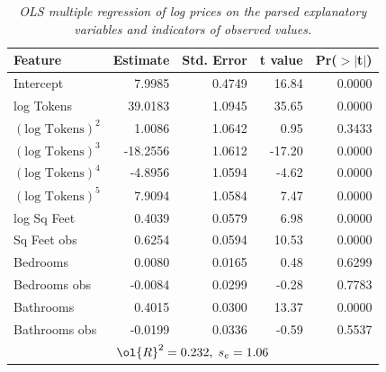 \documentclass[10pt]{article}
\begin{document}
 
 \begin{table}[ht]
\caption{ \label{tab:parsed} {\sl OLS multiple regression of log prices on the
 parsed explanatory variables and  indicators of observed values.}}
\centering
\begin{tabular}{lrrrr}
  \hline
    Feature       & Estimate & Std. Error & t value & Pr($>$$|$t$|$) \\ 
  \hline
  Intercept       & 7.9985 & 0.4749 & 16.84 & 0.0000 \\ 
  log Tokens      & 39.0183 & 1.0945 & 35.65 & 0.0000 \\ 
  $(\mbox{log Tokens})^2$   & 1.0086 & 1.0642 & 0.95 & 0.3433 \\ 
  $(\mbox{log Tokens})^3$ & -18.2556 & 1.0612 & -17.20 & 0.0000 \\ 
  $(\mbox{log Tokens})^4$ & -4.8956 & 1.0594 & -4.62 & 0.0000 \\ 
  $(\mbox{log Tokens})^5$ & 7.9094 & 1.0584 & 7.47 & 0.0000 \\ 
  log Sq Feet     & 0.4039 & 0.0579 & 6.98 & 0.0000 \\ 
  Sq Feet obs     & 0.6254 & 0.0594 & 10.53 & 0.0000 \\ 
  Bedrooms        & 0.0080 & 0.0165 & 0.48 & 0.6299 \\ 
  Bedrooms obs    & -0.0084 & 0.0299 & -0.28 & 0.7783 \\ 
  Bathrooms       & 0.4015 & 0.0300 & 13.37 & 0.0000 \\ 
  Bathrooms obs   & -0.0199 & 0.0336 & -0.59 & 0.5537 \\ 
   \hline
   \multicolumn{5}{c}{$\ol{R}^2 = 0.232, \; s_e = 1.06$}\\
   \hline
\end{tabular}
\end{table}

 
 
\end{document}
